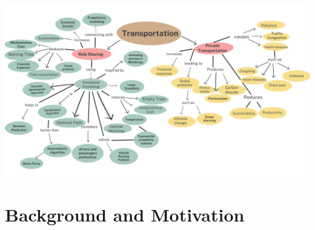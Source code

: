 \documentclass{article}
\begin{document}
\begin{itemize}
    \includegraphics[scale = 0.34]{hn_tra_27_ConceptMap_27.png}
\end{itemize}
\newpage
\section{Background and Motivation}
\end{document}
